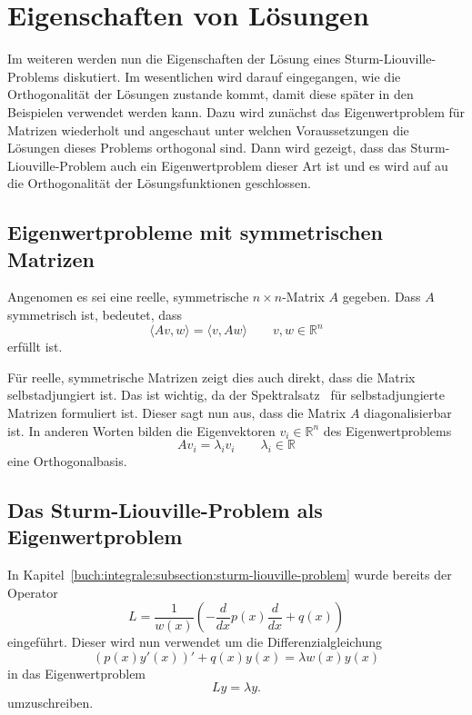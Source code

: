 %
%
%

\section{Eigenschaften von Lösungen
\label{sturmliouville:sec:solution-properties}}

Im weiteren werden nun die Eigenschaften der Lösung eines
Sturm-Liouville-Problems diskutiert.
Im wesentlichen wird darauf eingegangen, wie die Orthogonalität der Lösungen
zustande kommt, damit diese später in den Beispielen verwendet werden kann.
Dazu wird zunächst das Eigenwertproblem für Matrizen wiederholt und angeschaut
unter welchen Voraussetzungen die Lösungen dieses Problems orthogonal sind.
Dann wird gezeigt, dass das Sturm-Liouville-Problem auch ein Eigenwertproblem
dieser Art ist und es wird auf au die Orthogonalität der Lösungsfunktionen
geschlossen.

\subsection{Eigenwertprobleme mit symmetrischen Matrizen
\label{sturmliouville:sec:eigenvalue-problem-matrix}}


Angenomen es sei eine reelle, symmetrische $n \times n$-Matrix $A$ gegeben.
Dass $A$ symmetrisch ist, bedeutet, dass
\[
    \langle Av, w \rangle
    =
    \langle v, Aw \rangle
    \qquad
    v, w \in \mathbb{R}^n
\]
erfüllt ist.

Für reelle, symmetrische Matrizen zeigt dies auch direkt, dass die Matrix
selbstadjungiert ist.
Das ist wichtig, da der Spektralsatz~\cite{sturmliouville:spektralsatz-wiki}
für selbstadjungierte Matrizen formuliert ist. Dieser sagt nun aus, dass die
Matrix $A$ diagonalisierbar ist.
In anderen Worten bilden die Eigenvektoren $v_i \in \mathbb{R}^n$ des 
Eigenwertproblems
\[
    A v_i
    =
    \lambda_i v_i
    \qquad \lambda_i \in \mathbb{R}
\]
eine Orthogonalbasis.

\subsection{Das Sturm-Liouville-Problem als Eigenwertproblem}

In Kapitel~\ref{buch:integrale:subsection:sturm-liouville-problem} wurde bereits
der Operator
\[
    L
    =
    \frac{1}{w(x)}\left( -\frac{d}{dx}p(x) \frac{d}{dx} + q(x)\right)
\]
eingeführt.
Dieser wird nun verwendet um die Differenzialgleichung 
\[
    (p(x)y'(x))' + q(x)y(x)
    =
    \lambda w(x) y(x)
\]
in das Eigenwertproblem
\begin{equation}
    \label{sturmliouville:eq:eigenvalue-problem}
    L y
    =
    \lambda y.
\end{equation}
umzuschreiben.

